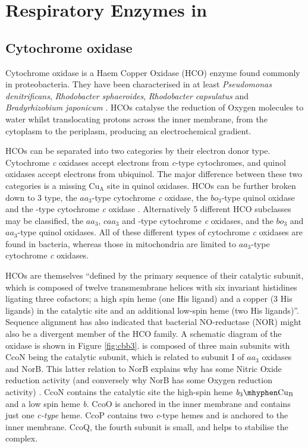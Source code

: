 \section{Respiratory Enzymes in \Nm{}}
\subsection{Cytochrome \cbbthree{} oxidase}
Cytochrome \cbbthree{} oxidase is a Haem Copper Oxidase (HCO) enzyme found commonly in proteobacteria. They have been characterised in at least \textit{Pseudomonas denitrificans}, \textit{Rhodobacter sphaeroides}, \textit{Rhodobacter capsulatus} and \textit{Bradyrhizobium japonicum} \cite{Pitcher2004}. HCOs catalyse the reduction of Oxygen molecules to water whilst translocating protons across the inner membrane, from the cytoplasm to the periplasm, producing an electrochemical gradient.

HCOs can be separated into two categories by their electron donor type. Cytochrome \textit{c} oxidases accept electrons from \textit{c}-type cytochromes, and quinol oxidases accept electrons from ubiquinol. The major difference between these two categories is a missing $\mathrm{Cu}_\mathrm{A}$ site in quinol oxidases\cite{Puustinen1996}. HCOs can be further broken down to 3 type, the $\mathit{aa}_3$-type cytochrome \textit{c} oxidase, the $\mathit{bo}_3$-type quinol oxidase and the \cbbthree{}-type cytochrome \textit{c} oxidase \cite{vanderOost1994}. Alternatively 5 different HCO subclasses may be classified, the $\mathit{aa}_3$, $\mathit{caa}_3$ and \cbbthree{}-type cytochrome \textit{c} oxidases, and the $\mathit{bo}_3$ and $\mathit{aa}_3$-type quinol oxidases\cite{Garcia-Horsman1994}. All of these different types of cytochrome \textit{c} oxidases are found in bacteria, whereas those in mitochondria are limited to $\mathit{aa}_3$-type cytochrome \textit{c} oxidases\cite{Keilin1939}.

HCOs are themselves ``defined by the primary sequence of their catalytic subunit, which is composed of twelve transmembrane helices with six invariant histidines ligating three cofactors; a high spin heme (one His ligand) and a copper (3 His ligands) in the catalytic site and an additional low-spin heme (two His ligands)''\cite{Huang2010}. Sequence alignment has also indicated that bacterial NO-reductase (NOR) might also be a divergent member of the HCO family. A schematic diagram of the \cbbthree{} oxidase is shown in Figure \ref{fig:cbb3}. \cbbthree{} is composed of three main subunits with CcoN being the catalytic subunit, which is related to subunit I of $\mathit{aa}_3$ oxidases and NorB. This latter relation to NorB explains why \cbbthree{} has some Nitric Oxide reduction activity (and conversely why NorB has some Oxygen reduction activity) \cite{Huang2010}. CcoN contains the catalytic site \textendash{} the high-spin heme $\mathit{b}_3\mhyphen\mathrm{Cu}_{\mathrm{B}}$ \textendash{} and a low spin heme \textit{b}. CcoO is anchored in the inner membrane and contains just one \textit{c-type} heme. CcoP contains two \textit{c}-type hemes and is anchored to the inner membrane. CcoQ, the fourth subunit is small, and helps to stabilise the complex\cite{Huang2010}.

